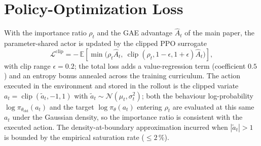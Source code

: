 \documentclass[lettersize,journal]{IEEEtran}
\begin{document}
\section{Policy-Optimization Loss}
\label{supp:ppo}
With the importance ratio $\rho_t$ and the GAE advantage $\hat A_t$ of the main paper, the parameter-shared actor is updated by the clipped PPO surrogate
\begin{equation}
  \mathcal{L}^{\mathrm{clip}}
   = -\,\mathbb{E}\!\left[
       \min\!\big(\rho_t\hat{A}_t,\
       \operatorname{clip}(\rho_t,1-\epsilon,1+\epsilon)\hat{A}_t\big)\right],
  \label{eq:ppo_clip}
\end{equation}
with clip range $\epsilon=0.2$; the total loss adds a value-regression term (coefficient $0.5$) and an entropy bonus annealed across the training curriculum. The action executed in the environment and stored in the rollout is the clipped variate $a_t=\operatorname{clip}(\tilde a_t,-1,1)$ with $\tilde a_t\sim\mathcal{N}(\mu_t,\sigma_t^2)$; both the behaviour log-probability $\log\pi_{\theta_{\mathrm{old}}}(a_t)$ and the target $\log\pi_\theta(a_t)$ entering $\rho_t$ are evaluated at this same $a_t$ under the Gaussian density, so the importance ratio is consistent with the executed action. The density-at-boundary approximation incurred when $|\tilde a_t|>1$ is bounded by the empirical saturation rate ($\le2\,\%$).

\end{document}
